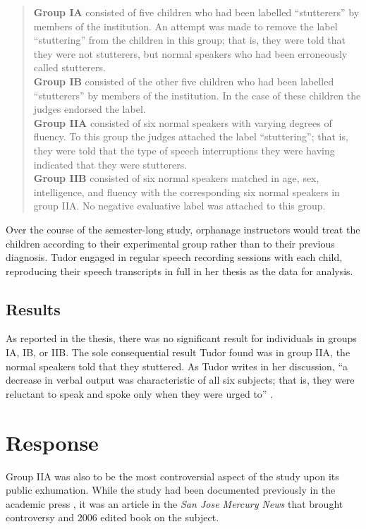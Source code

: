 \documentclass{../../../coursework}
\begin{document}
\begin{quote}
\textbf{Group IA} consisted of five children who had been labelled
``stutterers'' by members of the institution. An attempt was made to
remove the label ``stuttering'' from the children in this group; that
is, they were told that they were not stutterers, but normal speakers
who had been erroneously called stutterers.\\
\textbf{Group IB} consisted of the other five children who had been
labelled ``stutterers'' by members of the institution. In the case of
these children the judges endorsed the label.\\
\textbf{Group IIA} consisted of six normal speakers with varying degrees
of fluency. To this group the judges attached the label ``stuttering'';
that is, they were told that the type of speech interruptions they were
having indicated that they were stutterers.\\
\textbf{Group IIB} consisted of six normal speakers matched in age, sex,
intelligence, and fluency with the corresponding six normal speakers in
group IIA. No negative evaluative label was attached to this group.

\parencite[4]{Tud39}
\end{quote}

Over the course of the semester-long study, orphanage instructors would
treat the children according to their experimental group rather than to
their previous diagnosis. Tudor engaged in regular speech recording
sessions with each child, reproducing their speech transcripts in full
in her thesis as the data for analysis.

\subsection{Results}

As reported in the thesis, there was no significant result for
individuals in groups IA, IB, or IIB. The sole consequential result
Tudor found was in group IIA, the normal speakers told that they
stuttered. As Tudor writes in her discussion, ``a decrease in verbal
output was characteristic of all six subjects; that is, they were
reluctant to speak and spoke only when they were urged to'' \parencite[147]{Tud39}.

\section{Response}

Group IIA was also to be the most controversial aspect of the study upon
its public exhumation. While the study had been documented previously in
the academic press \parencite[see][]{Sil88}, it was an article in the
\emph{San Jose Mercury News} that brought controversy and 2006 edited
book on the subject.
\end{document}

